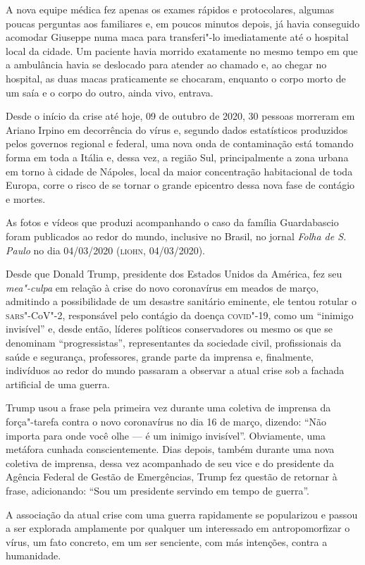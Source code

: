 A nova equipe médica fez apenas os exames rápidos e protocolares,
algumas poucas perguntas aos familiares e, em poucos minutos depois, já
havia conseguido acomodar Giuseppe numa maca para transferi"-lo
imediatamente até o hospital local da cidade. Um paciente havia morrido
exatamente no mesmo tempo em que a ambulância havia se deslocado para
atender ao chamado e, ao chegar no hospital, as duas macas praticamente
se chocaram, enquanto o corpo morto de um saía e o corpo do outro, ainda
vivo, entrava.

Desde o início da crise até hoje, 09 de outubro de 2020, 30 pessoas
morreram em Ariano Irpino em decorrência do vírus e, segundo dados
estatísticos produzidos pelos governos regional e federal, uma nova onda
de contaminação está tomando forma em toda a Itália e, dessa vez, a
região Sul, principalmente a zona urbana em torno à cidade de Nápoles,
local da maior concentração habitacional de toda Europa, corre o risco
de se tornar o grande epicentro dessa nova fase de contágio e mortes.

As fotos e vídeos que produzi acompanhando o caso da família
Guardabascio foram publicados ao redor do mundo, inclusive no Brasil, no
jornal \emph{Folha de S. Paulo} no dia 04/03/2020 (\textsc{liohn}, 04/03/2020).

Desde que Donald Trump, presidente dos Estados Unidos da América, fez
seu \emph{mea"-culpa} em relação à crise do novo coronavírus em meados de
março, admitindo a possibilidade de um desastre sanitário eminente, ele
tentou rotular o \textsc{sars}"-CoV"-2, responsável pelo contágio da doença
\textsc{covid}"-19, como um ``inimigo invisível'' e, desde então, líderes
políticos conservadores ou mesmo os que se denominam ``progressistas'',
representantes da sociedade civil, profissionais da saúde e segurança,
professores, grande parte da imprensa e, finalmente, indivíduos ao redor
do mundo passaram a observar a atual crise sob a fachada artificial de
uma guerra.

Trump usou a frase pela primeira vez durante uma coletiva de imprensa da
força"-tarefa contra o novo coronavírus no dia 16 de março, dizendo:
``Não importa para onde você olhe --- é um inimigo invisível''.
Obviamente, uma metáfora cunhada conscientemente. Dias depois, também
durante uma nova coletiva de imprensa, dessa vez acompanhado de seu vice
e do presidente da Agência Federal de Gestão de Emergências, Trump fez
questão de retornar à frase, adicionando: ``Sou um presidente servindo
em tempo de guerra''.

A associação da atual crise com uma guerra rapidamente se popularizou e
passou a ser explorada amplamente por qualquer um interessado em
antropomorfizar o vírus, um fato concreto, em um ser senciente, com más
intenções, contra a humanidade.

